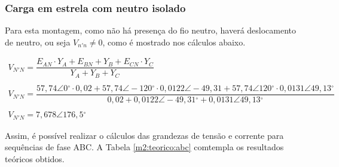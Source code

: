 \documentclass[a4paper,12pt,oneside,openany,table,xcdraw]{article}
\begin{document}
\begin{table}[H]
\centering \small {}
\caption{Dados teóricos para a montagem 1, em sequência CBA.}
\label{m1:teorico:cba}
\end{table}
\vspace{0.3cm}

\subsubsection{Carga em estrela com neutro isolado} \label{m2:teoria}
Para esta montagem, como não há presença do fio neutro, haverá deslocamento de neutro, ou seja $V_{n'n}\ne 0$, como é mostrado nos cálculos abaixo. 

\begin{equation*}
\begin{array}{l}
V_{N'N} =\dfrac{E_{AN} \cdotp Y_{A} +E_{BN} +Y_{B} +E_{CN} \cdotp Y_{C}}{Y_{A} +Y_{B} +Y_{C}}\\
\\
V_{N'N} =\dfrac{57,74\angle 0\mathrm{^{\circ }} \cdotp 0,02+57,74\angle -120\mathrm{^{\circ }} \cdotp 0,0122\angle -49,31+57,74\angle 120\mathrm{^{\circ }} \cdotp 0,0131\angle 49,13\mathrm{^{\circ }}}{0,02+0,0122\angle -49,31\mathrm{^{\circ }} +0,0131\angle 49,13\mathrm{^{\circ }}}\\
\\
V_{N'N} =7,678\angle 176,5\mathrm{^{\circ }}
\end{array}
\end{equation*}

Assim, é possível realizar o cálculos das grandezas de tensão e corrente para sequências de fase ABC. A Tabela \ref{m2:teorico:abc} comtempla os resultados teóricos obtidos.
\vspace{0.3cm}
\end{document}
